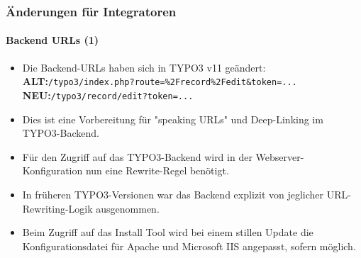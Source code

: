 %

\begin{frame}[fragile]
	\frametitle{Änderungen für Integratoren}
	\framesubtitle{Backend URLs (1)}

	\begin{itemize}
		\item Die Backend-URLs haben sich in TYPO3 v11 geändert:\newline
			\small
				\textbf{ALT:}\tabto{1.1cm}\texttt{/typo3/index.php?route=\%2Frecord\%2Fedit\&token=...}\newline
				\textbf{NEU:}\tabto{1.1cm}\texttt{/typo3/record/edit?token=...}
			\normalsize

		\item Dies ist eine Vorbereitung für "speaking URLs" und Deep-Linking im
			TYPO3-Backend.
		\item Für den Zugriff auf das TYPO3-Backend wird in der Webserver-Konfiguration
			nun eine Rewrite-Regel benötigt.
		\item In früheren TYPO3-Versionen war das Backend explizit von
			jeglicher URL-Rewriting-Logik ausgenommen.
		\item Beim Zugriff auf das Install Tool wird bei einem stillen Update
			die Konfigurationsdatei für Apache und Microsoft IIS angepasst,
			sofern möglich.

	\end{itemize}
\end{frame}

